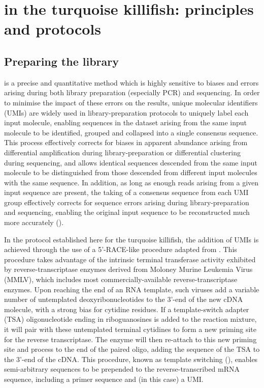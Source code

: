 \section{\igseq in the turquoise killifish: principles and protocols}
\label{sec:igseq_protocol}

\subsection{Preparing the \igseq library}
\label{sec:igseq_protocol_library}

\IGSEQ is a precise and quantitative method which is highly sensitive to biases and errors arising during both library preparation (especially PCR) and sequencing. In order to minimise the impact of these errors on the results, unique molecular identifiers (UMIs) are widely used in \igseq library-preparation protocols to uniquely label each input molecule, enabling sequences in the dataset arising from the same input molecule to be identified, grouped and collapsed into a single consensus sequence. This process effectively corrects for biases in apparent abundance arising from differential amplification during library-preparation or differential clustering during sequencing, and allows identical sequences descended from the same input molecule to be distinguished from those descended from different input molecules with the same sequence. In addition, as long as enough reads arising from a given input sequence are present, the taking of a consensus sequence from each UMI group effectively corrects for sequence errors arising during library-preparation and sequencing, enabling the original input sequence to be reconstructed much more accurately ().

In the \igseq protocol established here for the turquoise killifish, the addition of UMIs is achieved through the use of a 5'-RACE-like procedure adapted from \parencite{turchaninova2016igprep}. %
This procedure takes advantage of the intrinsic terminal transferase activity exhibited by reverse-transcriptase enzymes derived from Moloney Murine Leukemia Virus (MMLV), which includes most commercially-available reverse-transcriptase enzymes. Upon reaching the end of an RNA template, such viruses add a variable number of untemplated deoxyribonucleotides to the 3'-end of the new cDNA molecule, with a strong bias for cytidine residues. If a template-switch adapter (TSA) oligonucleotide ending in riboguanosines is added to the reaction mixture, it will pair with these untemplated terminal cytidines to form a new priming site for the reverse transcriptase. The enzyme will then re-attach to this new priming site and process to the end of the paired oligo, adding the sequence of the TSA to the 3'-end of the cDNA. This procedure, known as template switching (), enables semi-arbitrary sequences to be prepended to the reverse-transcribed mRNA sequence, including a primer sequence and (in this case) a UMI. %

